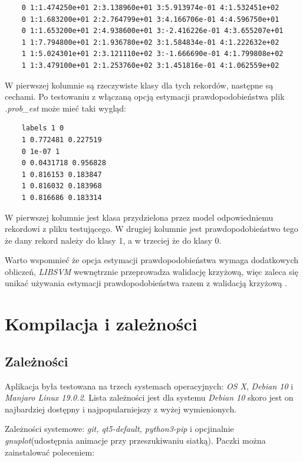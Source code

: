 \documentclass[paper=a4, fontsize=11pt]{scrartcl} %
\numberwithin{equation}{section} %
\numberwithin{figure}{section} %
\begin{document}
    \begin{verbatim}
    0 1:1.474250e+01 2:3.138960e+01 3:5.913974e-01 4:1.532451e+02
    0 1:1.683200e+01 2:2.764799e+01 3:4.166706e-01 4:4.596750e+01
    0 1:1.653200e+01 2:4.938600e+01 3:-2.416226e-01 4:3.655207e+01
    1 1:7.794800e+01 2:1.936780e+02 3:1.584834e-01 4:1.222632e+02
    1 1:5.024301e+01 2:3.121110e+02 3:-1.666690e-01 4:1.799808e+02
    1 1:3.479100e+01 2:1.253760e+02 3:1.451816e-01 4:1.062559e+02
    \end{verbatim} 

    W pierwszej kolumnie są rzeczywiste klasy dla tych rekordów, następne są cechami. Po
    testowaniu z włączaną opcją estymacji prawdopodobieństwa plik \textit{.prob\_est} może mieć
    taki wygląd:

    \begin{verbatim}
    labels 1 0
    1 0.772481 0.227519
    0 1e-07 1
    0 0.0431718 0.956828
    1 0.816153 0.183847
    1 0.816032 0.183968
    1 0.816686 0.183314
    \end{verbatim}

    \par W pierwszej kolumnie jest klasa przydzielona przez model odpowiedniemu
    rekordowi z pliku testującego. W drugiej kolumnie jest prawdopodobieństwo tego że dany
    rekord należy do klasy 1, a w trzeciej że do klasy 0.

    \par Warto wspomnieć że opcja estymacji prawdopodobieństwa wymaga dodatkowych obliczeń,
    \textit{LIBSVM} wewnętrznie przeprowadza walidację krzyżową, więc zaleca się unikać
    używania estymacji prawdopodobieństwa razem z walidacją krzyżową \cite{libsvm_faq}.


\newpage
\section{Kompilacja i zależności}
\subsection{Zależności}

    \par Aplikacja była testowana na trzech systemach operacyjnych: \textit{OS X},
    \textit{Debian 10} i \textit{Manjaro Linux 19.0.2}. Lista zależności jest dla systemu
    \textit{Debian 10} skoro jest on najbardziej dostępny i najpopularniejszy z wyżej
    wymienionych.
    \par Zależności systemowe: \textit{git, qt5-default, python3-pip} i opcjinalnie
    \textit{gnuplot}(udostępnia animacje przy przeszukiwaniu siatką). Paczki można zainstalować
    poleceniem:
\end{document}
